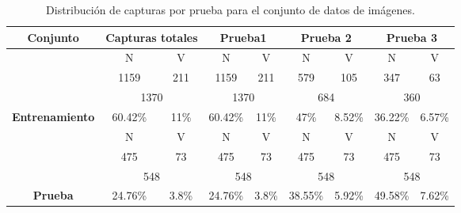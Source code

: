 \documentclass[twoside,spanish,ESP,MSc]{plantillaLabUPV}
\theoremstyle{definition}
\begin{document}
\begin{table}[!tbh]
	\caption{Distribución de capturas por prueba para el conjunto de datos de imágenes.}
	\label{imadat}
	\centering
	\begin{tabular}{|c|c|c|c|c|c|c|c|c|}
		\hline
		\textbf{Conjunto}                               & \multicolumn{2}{c|}{\textbf{Capturas totales}}      & \multicolumn{2}{c|}{\textbf{Prueba1}}               & \multicolumn{2}{c|}{\textbf{Prueba 2}}              & \multicolumn{2}{c|}{\textbf{Prueba 3}}              \\ \hline
		& {\color[HTML]{F56B00} N} & {\color[HTML]{009901} V} & {\color[HTML]{F56B00} N} & {\color[HTML]{009901} V} & {\color[HTML]{F56B00} N} & {\color[HTML]{009901} V} & {\color[HTML]{F56B00} N} & {\color[HTML]{009901} V} \\ \cline{2-9} 
		& 1159                     & 211                      & 1159                     & 211                      & 579                        & 105                        & 347                        & 63                        \\
		\cline{2-9} 
		& \multicolumn{2}{c|}{1370}                           & \multicolumn{2}{c|}{1370}                           & \multicolumn{2}{c|}{684}                           & \multicolumn{2}{c|}{360}                           \\ \cline{2-9} 
		\multirow{-4}{*}{\textbf{Entrenamiento}}   & 60.42\%                  & 11\%                   & 60.42\%                  & 11\%                   & 47\%                      & 8.52\%                      & 36.22\%                      & 6.57\%                      \\ \hline
		& {\color[HTML]{F56B00} N} & {\color[HTML]{009901} V} & {\color[HTML]{F56B00} N} & {\color[HTML]{009901} V} & {\color[HTML]{F56B00} N} & {\color[HTML]{009901} V} & {\color[HTML]{F56B00} N} & {\color[HTML]{009901} V} \\ \cline{2-9} 
		& 475                      & 73                       & 475                      & 73                       & 475                        & 73                        & 475                        & 73                        \\
		\cline{2-9} 
		& \multicolumn{2}{c|}{548}                           & \multicolumn{2}{c|}{548}                           & \multicolumn{2}{c|}{548}                           & \multicolumn{2}{c|}{548}                           \\ \cline{2-9} 
		\multirow{-4}{*}{\textbf{Prueba}}            & 24.76\%                  & 3.8\%                   & 24.76\%                  & 3.8\%                   & 38.55\%                      & 5.92\%                      & 49.58\%                      & 7.62\%                      \\ \hline

\end{tabular}
\end{table}
\end{document}
